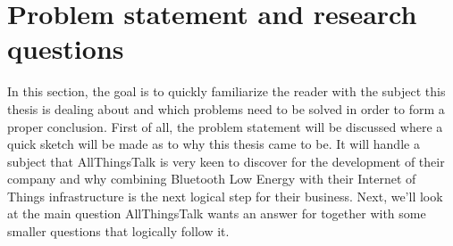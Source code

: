 \documentclass[pdftex,a4paper,12pt,twoside]{report}
\begin{document}


\newpage{}
\section{Problem statement and research questions}
\label{sec:problemdefinition}
In this section, the goal is to quickly familiarize the reader with the subject this thesis is dealing about and which problems need to be solved in order to form a proper conclusion. First of all, the problem statement will be discussed where a quick sketch will be made as to why this thesis came to be. It will handle a subject that AllThingsTalk is very keen to discover for the development of their company and why combining Bluetooth Low Energy with their Internet of Things infrastructure is the next logical step for their business. Next, we'll look at the main question AllThingsTalk wants an answer for together with some smaller questions that logically follow it.
\end{document}
